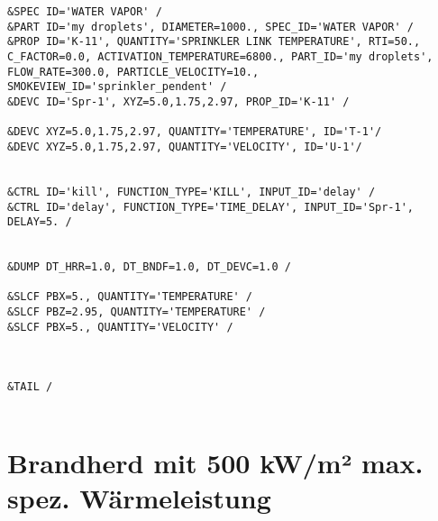 \begin{lstlisting}[emptylines=0,basicstyle=\tiny]
&SPEC ID='WATER VAPOR' /
&PART ID='my droplets', DIAMETER=1000., SPEC_ID='WATER VAPOR' /
&PROP ID='K-11', QUANTITY='SPRINKLER LINK TEMPERATURE', RTI=50., C_FACTOR=0.0, ACTIVATION_TEMPERATURE=6800., PART_ID='my droplets', FLOW_RATE=300.0, PARTICLE_VELOCITY=10., SMOKEVIEW_ID='sprinkler_pendent' /
&DEVC ID='Spr-1', XYZ=5.0,1.75,2.97, PROP_ID='K-11' /

&DEVC XYZ=5.0,1.75,2.97, QUANTITY='TEMPERATURE', ID='T-1'/
&DEVC XYZ=5.0,1.75,2.97, QUANTITY='VELOCITY', ID='U-1'/


&CTRL ID='kill', FUNCTION_TYPE='KILL', INPUT_ID='delay' /
&CTRL ID='delay', FUNCTION_TYPE='TIME_DELAY', INPUT_ID='Spr-1', DELAY=5. /


&DUMP DT_HRR=1.0, DT_BNDF=1.0, DT_DEVC=1.0 /

&SLCF PBX=5., QUANTITY='TEMPERATURE' /
&SLCF PBZ=2.95, QUANTITY='TEMPERATURE' /
&SLCF PBX=5., QUANTITY='VELOCITY' /



&TAIL /


\end{lstlisting}
\section{Brandherd mit 500 kW/m² max. spez. Wärmeleistung}
